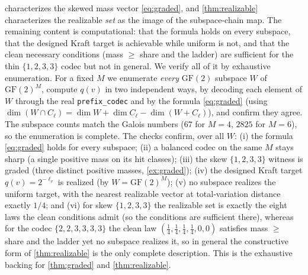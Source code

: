 \documentclass[11pt]{article}
\theoremstyle{definition}
\theoremstyle{plain}
\theoremstyle{remark}
\newcommand{\GF}{\mathrm{GF}(2)}
\newcommand{\W}{W}                          %
\newcommand{\inter}{\cap}
\begin{document}
 characterizes the skewed mass vector \eqref{eq:graded}, and
\cref{thm:realizable} characterizes the realizable \emph{set} as the image of the
subspace-chain map. The remaining content is computational: that the formula holds on every
subspace, that the designed Kraft target is achievable while uniform is not, and that the clean
necessary conditions (mass $\ge$ share and the ladder) are sufficient for the thin
$\{1,2,3,3\}$ codec but not in general. We verify all of it by exhaustive enumeration. For a fixed $M$ we enumerate \emph{every} $\GF$ subspace $\W$ of $\GF^M$, compute
$q(v)$ in two independent ways, by decoding each element of $\W$ through the real
\texttt{prefix\_codec} and by the formula \eqref{eq:graded} (using $\dim(\W \inter C_\ell) =
\dim \W + \dim C_\ell - \dim(\W + C_\ell)$), and confirm they agree. The subspace counts match
the Galois numbers ($67$ for $M = 4$, $2825$ for $M = 6$), so the enumeration is complete. The
checks confirm, over all $\W$: (i) the formula \eqref{eq:graded} holds for every subspace; (ii)
a balanced codec on the same $M$ stays sharp (a single positive mass on its hit classes); (iii)
the skew $\{1,2,3,3\}$ witness is graded (three distinct positive masses, \cref{ex:graded});
(iv) the designed Kraft target $q(v) = 2^{-\ell_v}$ is realized (by $\W = \GF^M$); (v) no
subspace realizes the uniform target, with the nearest realizable vector at total-variation
distance exactly $1/4$; and (vi) for skew $\{1,2,3,3\}$ the realizable set is exactly the eight
laws the clean conditions admit (so the conditions are sufficient there), whereas for the codec
$\{2,2,3,3,3,3\}$ the clean law $(\tfrac14,\tfrac14,\tfrac14,\tfrac14,0,0)$ satisfies mass
$\ge$ share and the ladder yet no subspace realizes it, so in general the constructive
form of \cref{thm:realizable} is the only complete description. This is the exhaustive backing
for \cref{thm:graded} and \cref{thm:realizable}.



\end{document}
